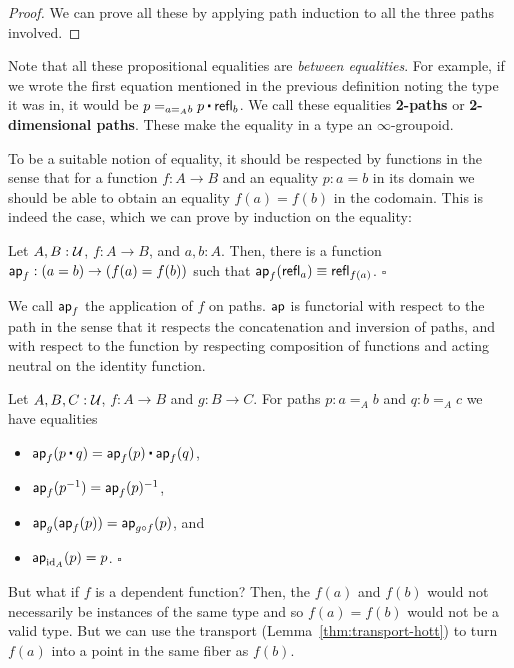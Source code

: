 \begin{proof}
We can prove all these by applying path induction to all the three paths involved.
\end{proof}

Note that all these propositional equalities are \emph{between equalities}. For example,
if we wrote the first equation mentioned in the previous definition noting the
type it was in, it would be $p =_{a =_A b} p \ct \refl_b$.
We call these equalities \textbf{2-paths} or \textbf{2-dimensional paths}.
These make the equality in a type an $\infty$-groupoid.

To be a suitable notion of equality, it should be respected by functions in the
sense that for a function $f : A \to B$ and an equality $p : a = b$ in its domain
we should be able to obtain an equality $f(a) = f(b)$ in the codomain.
This is indeed the case, which we can prove by induction on the equality:
\begin{lemma}
Let $A, B : \mathcal{U}$, $f : A \to B$, and $a, b : A$. Then, there is a function
$\mathsf{ap}_f : (a = b) \to (f(a) = f(b))$ such that $\mathsf{ap}_f(\mathsf{refl}_a) \equiv \mathsf{refl}_{f(a)}$.
\hfill $\square$
\end{lemma}

We call $\mathsf{ap}_f$ the application of $f$ on paths. $\mathsf{ap}$ is functorial with respect
to the path in the sense that it respects the concatenation and inversion of
paths, and with respect to the function by respecting composition of functions
and acting neutral on the identity function.

\begin{lemma}
Let $A, B, C : \mathcal{U}$, $f : A \to B$ and $g : B \to C$. For paths $p : a =_A b$ and
$q : b =_A c$ we have equalities
\begin{itemize}
\item $\ap_f(p \ct q) = \ap_f(p) \ct \ap_f(q)$,
\item $\mathsf{ap}_f(p^{-1}) = \mathsf{ap}_f(p)^{-1}$,
\item $\mathsf{ap}_g(\mathsf{ap}_f(p)) = \mathsf{ap}_{g \circ f}(p)$, and
\item $\mathsf{ap}_{\operatorname{id}_A}(p) = p$. \hfill $\square$
\end{itemize}
\end{lemma}

But what if $f$ is a dependent function? Then, the $f(a)$ and $f(b)$ would not
necessarily be instances of the same type and so $f(a) = f(b)$ would not be a
valid type.
But we can use the transport (Lemma~\ref{thm:transport-hott}) to turn $f(a)$ into
a point in the same fiber as $f(b)$.

